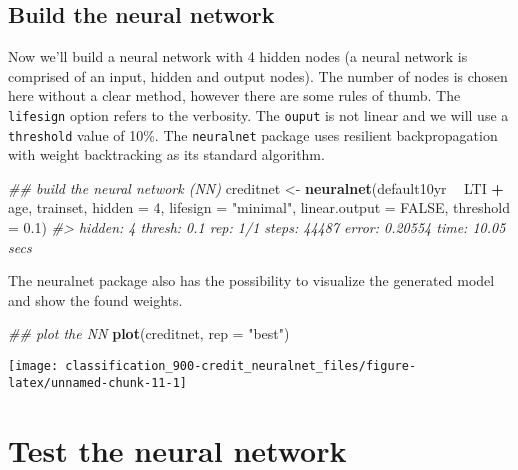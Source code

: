 \documentclass[]{book}
\newenvironment{Shaded}{\begin{snugshade}}{\end{snugshade}}
\newcommand{\CommentTok}[1]{\textcolor[rgb]{0.56,0.35,0.01}{\textit{#1}}}
\newcommand{\DataTypeTok}[1]{\textcolor[rgb]{0.13,0.29,0.53}{#1}}
\newcommand{\DecValTok}[1]{\textcolor[rgb]{0.00,0.00,0.81}{#1}}
\newcommand{\FloatTok}[1]{\textcolor[rgb]{0.00,0.00,0.81}{#1}}
\newcommand{\KeywordTok}[1]{\textcolor[rgb]{0.13,0.29,0.53}{\textbf{#1}}}
\newcommand{\NormalTok}[1]{#1}
\newcommand{\OperatorTok}[1]{\textcolor[rgb]{0.81,0.36,0.00}{\textbf{#1}}}
\newcommand{\OtherTok}[1]{\textcolor[rgb]{0.56,0.35,0.01}{#1}}
\newcommand{\StringTok}[1]{\textcolor[rgb]{0.31,0.60,0.02}{#1}}
\begin{document}
\hypertarget{build-the-neural-network}{%
\subsection{Build the neural network}\label{build-the-neural-network}}

Now we'll build a neural network with 4 hidden nodes (a neural network is comprised of an input, hidden and output nodes). The number of nodes is chosen here without a clear method, however there are some rules of thumb. The \texttt{lifesign} option refers to the verbosity. The \texttt{ouput} is not linear and we will use a \texttt{threshold} value of 10\%. The \texttt{neuralnet} package uses resilient backpropagation with weight backtracking as its standard algorithm.

\begin{Shaded}
\begin{Highlighting}[]
\CommentTok{## build the neural network (NN)}
\NormalTok{creditnet <-}\StringTok{ }\KeywordTok{neuralnet}\NormalTok{(default10yr }\OperatorTok{~}\StringTok{ }\NormalTok{LTI }\OperatorTok{+}\StringTok{ }\NormalTok{age, trainset, }
                       \DataTypeTok{hidden =} \DecValTok{4}\NormalTok{, }
                       \DataTypeTok{lifesign =} \StringTok{"minimal"}\NormalTok{, }
                       \DataTypeTok{linear.output =} \OtherTok{FALSE}\NormalTok{, }
                       \DataTypeTok{threshold =} \FloatTok{0.1}\NormalTok{)}
\CommentTok{#> hidden: 4    thresh: 0.1    rep: 1/1    steps:   44487   error: 0.20554  time: 10.05 secs}
\end{Highlighting}
\end{Shaded}

The neuralnet package also has the possibility to visualize the generated model and show the found weights.

\begin{Shaded}
\begin{Highlighting}[]
\CommentTok{## plot the NN}
\KeywordTok{plot}\NormalTok{(creditnet, }\DataTypeTok{rep =} \StringTok{"best"}\NormalTok{)}
\end{Highlighting}
\end{Shaded}

\begin{center}\texttt{[image: classification\_900-credit\_neuralnet\_files/figure-latex/unnamed-chunk-11-1]} \end{center}

\hypertarget{test-the-neural-network}{%
\section{Test the neural network}\label{test-the-neural-network}}
\end{document}
